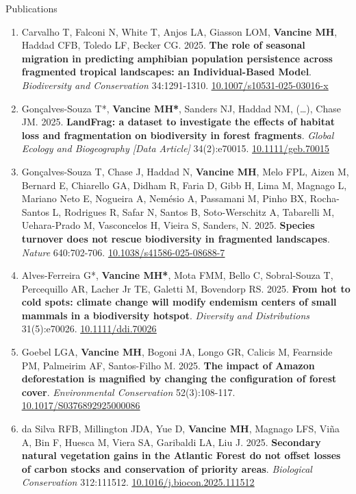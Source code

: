 \documentclass{resume}
\begin{document}
\begin{rSection}{Publications}
\begin{enumerate}
\item Carvalho T, Falconi N, White T, Anjos LA, Giasson LOM, \textbf{Vancine MH}, Haddad CFB, Toledo LF, Becker CG. 2025. \textbf{The role of seasonal migration in predicting amphibian population persistence across fragmented tropical landscapes: an Individual-Based Model}. \textit{Biodiversity and Conservation} 34:1291-1310. \href{https://doi.org/10.1007/s10531-025-03016-x}{\underline{10.1007/s10531-025-03016-x}}

\item Gonçalves-Souza T*, \textbf{Vancine MH*}, Sanders NJ, Haddad NM, (…), Chase JM. 2025. \textbf{LandFrag: a dataset to investigate the effects of habitat loss and fragmentation on biodiversity in forest fragments}. \textit{Global Ecology and Biogeography [Data Article]} 34(2):e70015. \href{https://doi.org/10.1111/geb.70015}{\underline{10.1111/geb.70015}}

\item Gonçalves-Souza T, Chase J, Haddad N, \textbf{Vancine MH}, Melo FPL, Aizen M, Bernard E, Chiarello GA, Didham R, Faria D, Gibb H, Lima M, Magnago L, Mariano Neto E, Nogueira A, Nemésio A, Passamani M, Pinho BX, Rocha-Santos L, Rodrigues R, Safar N, Santos B, Soto-Werschitz A, Tabarelli M, Uehara-Prado M, Vasconcelos H, Vieira S, Sanders, N. 2025. \textbf{Species turnover does not rescue biodiversity in fragmented landscapes}. \textit{Nature} 640:702-706. \href{https://doi.org/10.1038/s41586-025-08688-7}{\underline{10.1038/s41586-025-08688-7}}

\item Alves-Ferreira G*, \textbf{Vancine MH*}, Mota FMM, Bello C, Sobral-Souza T, Percequillo AR, Lacher Jr TE, Galetti M, Bovendorp RS. 2025. \textbf{From hot to cold spots: climate change will modify endemism centers of small mammals in a biodiversity hotspot}. \textit{Diversity and Distributions} 31(5):e70026. \href{https://doi.org/10.1111/ddi.70026}{\underline{10.1111/ddi.70026}} 

\item Goebel LGA, \textbf{Vancine MH}, Bogoni JA, Longo GR, Calicis M, Fearnside PM, Palmeirim AF, Santos-Filho M. 2025. \textbf{The impact of Amazon deforestation is magnified by changing the configuration of forest cover}. \textit{Environmental Conservation} 52(3):108-117. \href{https://doi.org/10.1017/S0376892925000086}{\underline{10.1017/S0376892925000086}}

\item da Silva RFB, Millington JDA, Yue D, \textbf{Vancine MH}, Magnago LFS, Viña A, Bin F, Huesca M, Viera SA, Garibaldi LA, Liu J. 2025. \textbf{Secondary natural vegetation gains in the Atlantic Forest do not offset losses of carbon stocks and conservation of priority areas}. \textit{Biological Conservation} 312:111512. \href{https://doi.org/10.1016/j.biocon.2025.111512}{\underline{10.1016/j.biocon.2025.111512}}


\end{enumerate}
\end{rSection}
\end{document}
